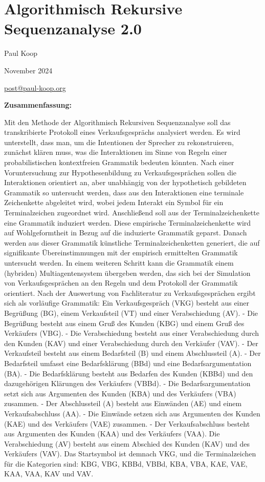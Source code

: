\documentclass[
]{article}
\author{}
\date{}
\begin{document}
\section{\texorpdfstring{\textbf{Algorithmisch Rekursive Sequenzanalyse
2.0}}{Algorithmisch Rekursive Sequenzanalyse 2.0}}\label{algorithmisch-rekursive-sequenzanalyse-2.0}

Paul Koop

November 2024

\href{mailto:post@paul-koop.org}{\ul{post@paul-koop.org}}

\textbf{Zusammenfassung:}

Mit den Methode der Algorithmisch Rekursiven Sequenzanalyse soll das
transkribierte Protokoll eines Verkaufsgesprächs analysiert werden. Es
wird unterstellt, dass man, um die Intentionen der Sprecher zu
rekonstruieren, zunächst klären muss, was die Interaktionen im Sinne von
Regeln einer probabilistischen kontextfreien Grammatik bedeuten könnten.
Nach einer Voruntersuchung zur Hypothesenbildung zu Verkaufsgesprächen
sollen die Interaktionen orientiert an, aber unabhängig von der
hypothetisch gebildeten Grammatik so untersucht werden, dass aus den
Interaktionen eine terminale Zeichenkette abgeleitet wird, wobei jedem
Interakt ein Symbol für ein Terminalzeichen zugeordnet wird.
Anschließend soll aus der Terminalzeichenkette eine Grammatik induziert
werden. Diese empirische Terminalzeichenkette wird auf Wohlgeformtheit
in Bezug auf die induzierte Grammatik geparst. Danach werden aus dieser
Grammatik künstliche Terminalzeichenketten generiert, die auf
signifikante Übereinstimmungen mit der empirisch ermittelten Grammatik
untersucht werden. In einem weiteren Schritt kann die Grammatik einem
(hybriden) Multiagentensystem übergeben werden, das sich bei der
Simulation von Verkaufsgesprächen an den Regeln und dem Protokoll der
Grammatik orientiert. Nach der Auswertung von Fachliteratur zu
Verkaufsgesprächen ergibt sich als vorläufige Grammatik: Ein
Verkaufsgespräch (VKG) besteht aus einer Begrüßung (BG), einem
Verkaufsteil (VT) und einer Verabschiedung (AV). - Die Begrüßung besteht
aus einem Gruß des Kunden (KBG) und einem Gruß des Verkäufers (VBG). -
Die Verabschiedung besteht aus einer Verabschiedung durch den Kunden
(KAV) und einer Verabschiedung durch den Verkäufer (VAV). - Der
Verkaufsteil besteht aus einem Bedarfsteil (B) und einem Abschlussteil
(A). - Der Bedarfsteil umfasst eine Bedarfsklärung (BBd) und eine
Bedarfsargumentation (BA). - Die Bedarfsklärung besteht aus Bedarfen des
Kunden (KBBd) und den dazugehörigen Klärungen des Verkäufers (VBBd). -
Die Bedarfsargumentation setzt sich aus Argumenten des Kunden (KBA) und
des Verkäufers (VBA) zusammen. - Der Abschlussteil (A) besteht aus
Einwänden (AE) und einem Verkaufsabschluss (AA). - Die Einwände setzen
sich aus Argumenten des Kunden (KAE) und des Verkäufers (VAE) zusammen.
- Der Verkaufsabschluss besteht aus Argumenten des Kunden (KAA) und des
Verkäufers (VAA). Die Verabschiedung (AV) besteht aus einem Abschied des
Kunden (KAV) und des Verkäufers (VAV). Das Startsymbol ist demnach VKG,
und die Terminalzeichen für die Kategorien sind: KBG, VBG, KBBd, VBBd,
KBA, VBA, KAE, VAE, KAA, VAA, KAV und VAV.
\end{document}
